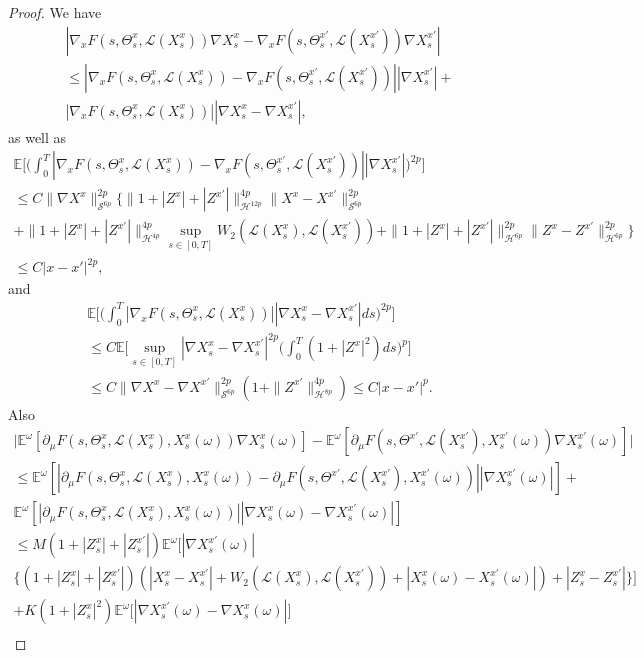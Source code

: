 \documentclass[12,english]{amsart}
\theoremstyle{plain}
\theoremstyle{definition}
\theoremstyle{plain}
\theoremstyle{plain}
\theoremstyle{remark}
\newcommand{\E}{\mathbb E}
\newcommand{\cH}{\mathcal H}
\newcommand{\cL}{\mathcal L}
\newcommand{\cS}{\mathcal S}
\newcommand{\om}{\omega}
\newcommand{\Te}{\Theta}
\begin{document}
\begin{proof}
  We have
  \begin{multline*}
 |\nabla_xF(s,\Te^x_s,\cL(X^x_s))\nabla X^x_s-\nabla_xF(s,\Te_s ^{x'},\cL(X^{x'}_s))\nabla X^{x'}_s|\\\le
|\nabla_xF(s,\Te^x_s,\cL(X^x_s))-\nabla_xF(s,\Te_s ^{x'},\cL(X^{x'}_s))||\nabla X^{x'}_s|+\\
|\nabla_xF(s,\Te^x_s,\cL(X^x_s))||\nabla X^x_s-\nabla X^{x'}_s|,
\end{multline*}
as well as
\begin{multline*}
 \E\Big[\Big(\int_0^T|\nabla_xF(s,\Te^x_s,\cL(X^x_s))
    -\nabla_xF(s,\Te_s ^{x'},\cL(X^{x'}_s))||\nabla
    X^{x'}_s|\Big)^{2p}\Big]\\\le C
\|\nabla
X^x\|_{\cS^{6p}}^{2p}\{\|1+|Z^x|+|Z^{x'}|\|_{\cH^{12p}}^{4p}\|X^x-X^{x'}\|_{\cS^{6p}}^{2p}\\+\|1+|Z^x|+|Z^{x'}|\|_{\cH^{4p}}^{4p}\sup_{s\in[0,T]}W_2(\cL(X^x_s), \cL(X^{x'}_s))
+\|1+|Z^x|+|Z^{x'}|\|_{\cH^{6p}}^{2p}\|Z^x-Z^{x'}\|_{\cH^{6p}}^{2p}\}\\\le C|x-x'|^{2p},
  \end{multline*}
and
  \begin{multline*}
    \E\Big[\Big(\int_0^T |\nabla_xF(s,\Te^x_s,\cL(X^x_s))||\nabla
    X^x_s-\nabla X^{x'}_s|ds\Big)^{2p}\Big]\\\le C
\E\Big[\sup_{s\in[0,T]}|\nabla X^x_s-\nabla X^{x'}_s|^{2p}
\Big(\int_0^T(1+|Z^x|^2)ds\Big)^p\Big]\\\le C
\|\nabla X^x-\nabla X^{x'}\|_{\cS^{6p}}^{2p}(1+\|Z^{x'}\|_{\cH^{8p}}^{4p})
\le C|x-x'|^p.
\end{multline*}
Also
\begin{multline*}
\big|\E^\om[\partial_\mu F(s,\Te^x_s,\cL(X^x_s), X^x_s(\om))\nabla X^x_s(\om)]
 -\E^\om[\partial_\mu F(s,\Te^{x'},\cL(X^{x'}_s), X^{x'}_s(\om))\nabla X^{x'}_s(\om)]\big|\\\le
  \E^\om[|\partial_\mu F(s,\Te^x_s,\cL(X^x_s), X^x_s(\om))
  -\partial_\mu F(s,\Te^{x'},\cL(X^{x'}_s), X^{x'}_s(\om))||\nabla X^{x'}_s(\om)|]
+\\ \E^\om[|\partial_\mu F(s,\Te^x_s,\cL(X^x_s), X^x_s(\om))||\nabla X^x_s(\om)-\nabla X^{x'}_s(\om)|]\\\le
M (1+|Z^x_s|+|Z^{x'}_s|)\E^\om\big[|\nabla X^{x'}_s(\om)|\\
  \{(1+|Z^x_s|+|Z^{x'}_s|)(|X^x_s-X^{x'}_s|+W_2(\cL(X^x_s),\cL(X^{x'}_s))
  +|X^x_s(\om)-X^{x'}_s(\om)|)+|Z^x_s-Z^{x'}_s|\}\big]\\
  +K (1+|Z^x_s|^2)\E^\om\big[|\nabla X^{x'}_s(\om)-\nabla X^x_s(\om)|\big]\\

\end{multline*}
\end{proof}
\end{document}
